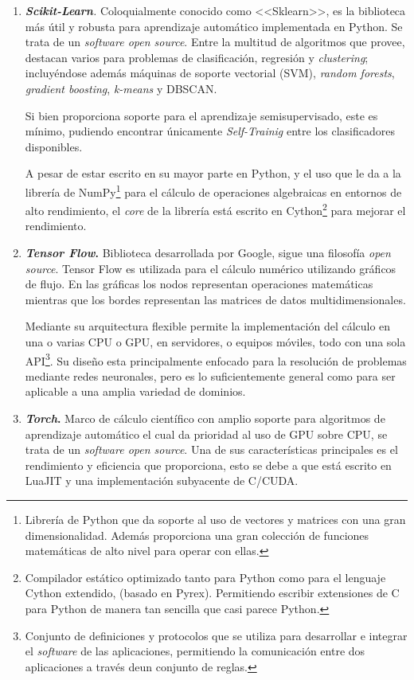 \begin{enumerate}
\item \textit{\textbf{Scikit-Learn}.}
Coloquialmente conocido como <<Sklearn>>, es la biblioteca más útil y robusta para aprendizaje automático implementada en Python. Se trata de un \textit{software open source}. Entre la multitud de algoritmos que provee, destacan varios para problemas de clasificación, regresión y \textit{clustering}; incluyéndose además máquinas de soporte vectorial (SVM), \textit{random forests}, \textit{gradient boosting}, \textit{k-means} y DBSCAN.

Si bien proporciona soporte para el aprendizaje semisupervisado, este es mínimo, pudiendo encontrar únicamente \textit{Self-Trainig} entre los clasificadores disponibles.

A pesar de estar escrito en su mayor parte en Python, y el uso que le da a la librería de NumPy\footnote{Librería de Python que da soporte al uso de vectores y matrices con una gran dimensionalidad. Además proporciona una gran colección de funciones matemáticas de alto nivel para operar con ellas.} para el cálculo de operaciones algebraicas en entornos de alto rendimiento, el \textit{core} de la librería está escrito en Cython\footnote{Compilador estático optimizado tanto para Python como para el lenguaje Cython extendido, (basado en Pyrex). Permitiendo escribir extensiones de C para Python de manera tan sencilla que casi parece Python.} para mejorar el rendimiento. 

\item \textbf{\textit{Tensor Flow}.}
Biblioteca desarrollada por Google, sigue una filosofía \textit{open source}. Tensor Flow es utilizada para el cálculo numérico utilizando gráficos de flujo. En las gráficas los nodos representan operaciones matemáticas mientras que los bordes representan las matrices de datos multidimensionales.

Mediante su arquitectura flexible permite la implementación del cálculo en una o varias CPU o GPU, en servidores, o equipos móviles, todo con una sola API\footnote{Conjunto de definiciones y protocolos que se utiliza para desarrollar e integrar el \textit{software} de  las aplicaciones, permitiendo la comunicación entre dos aplicaciones a través deun conjunto de reglas.}. Su diseño esta principalmente enfocado para la resolución de problemas mediante redes neuronales, pero es lo suficientemente general como para ser aplicable a una amplia variedad de dominios.

\item \textbf{\textit{Torch}.}
Marco de cálculo científico con amplio soporte para algoritmos de aprendizaje automático el cual da prioridad al uso de GPU sobre CPU, se trata de un \textit{software open source}. Una de sus características principales es el rendimiento y eficiencia que proporciona, esto se debe a que está escrito en LuaJIT y una implementación subyacente de C/CUDA.


\end{enumerate}
